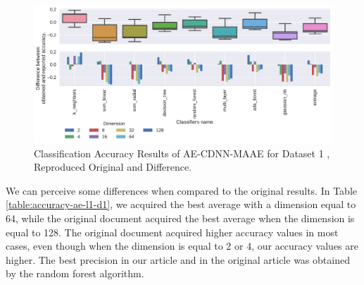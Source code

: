 \begin{figure}[!ht]
    \centering
    \includegraphics[width=0.8\linewidth]{figure/table_3.pdf}
    \caption{Classification Accuracy Results of AE-CDNN-MAAE for Dataset 1 \cite{WenZha:2018}, Reproduced Original and Difference.}
\label{fig:acc-AE-CDNN-MAAE-d1}
\end{figure}

We can perceive some differences when compared to the original results. In Table \ref{table:accuracy-ae-l1-d1}, we acquired the best average with a dimension equal to 64, while the original document acquired the best average when the dimension is equal to 128. The original document acquired higher accuracy values in most cases, even though when the dimension is equal to 2 or 4, our accuracy values are higher. The best precision in our article and in the original article was obtained by the random forest algorithm.


